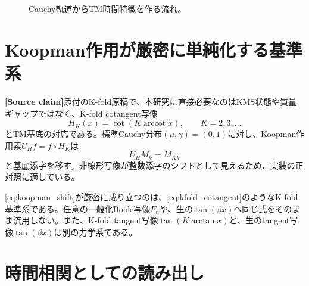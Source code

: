 \documentclass[a4paper,11pt,oneside,openany]{ltjsbook}
\newcommand{\R}{\mathbb{R}}
\newcommand{\SourceClaim}{\textcolor{Brick}{\sffamily\bfseries [Source claim]}}
\begin{document}
\begin{figure}[htbp]
\centering
{}
\caption{Cauchy軌道からTM時間特徴を作る流れ。}
\label{fig:cauchy_tm_pipeline}
\end{figure}

\section{Koopman作用が厳密に単純化する基準系}

\SourceClaim 添付のK-fold原稿で、本研究に直接必要なのはKMS状態や質量ギャップではなく、K-fold cotangent写像
\begin{equation}
  H_K(x)=\cot\left(K\operatorname{arccot}x\right),
  \qquad K=2,3,\dots
  \label{eq:kfold_cotangent}
\end{equation}
とTM基底の対応である\cite{mass_gap}。標準Cauchy分布\((\mu,\gamma)=(0,1)\)に対し、Koopman作用素\(U_H f=f\circ H_K\)は
\begin{equation}
  U_H M_k=M_{Kk}
  \label{eq:koopman_shift}
\end{equation}
と基底添字を移す。非線形写像が整数添字のシフトとして見えるため、実装の正対照に適している。

\begin{cautionbox}
\cref{eq:koopman_shift}が厳密に成り立つのは、\cref{eq:kfold_cotangent}のようなK-fold基準系である。任意の一般化Boole写像\(F_\alpha\)や、生の\(\tan(\beta x)\)へ同じ式をそのまま流用しない。また、K-fold tangent写像\(\tan(K\arctan x)\)と、生のtangent写像\(\tan(\beta x)\)は別の力学系である。
\end{cautionbox}

\section{時間相関としての読み出し}
\end{document}
